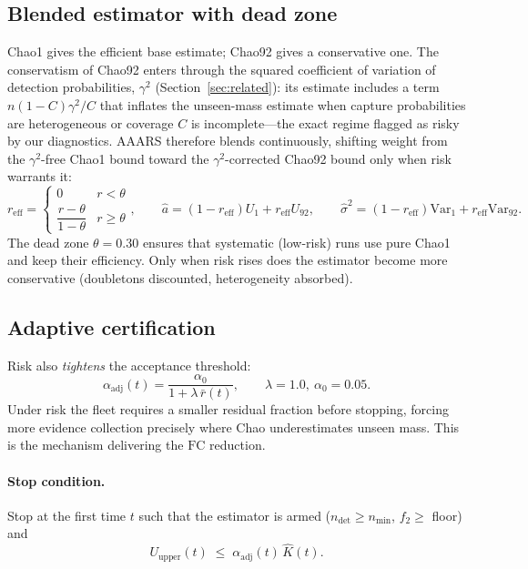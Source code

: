 \documentclass[11pt]{article}
\newcommand{\FC}{\mathrm{FC}}
\newcommand{\Khat}{\hat{K}}
\begin{document}
\subsection{Blended estimator with dead zone}
Chao1 gives the efficient base estimate; Chao92 gives a conservative one. The conservatism of
Chao92 enters through the squared coefficient of variation of detection probabilities, $\gamma^2$
(Section~\ref{sec:related}): its estimate includes a term $n(1-C)\gamma^2/C$ that inflates the
unseen-mass estimate when capture probabilities are heterogeneous or coverage $C$ is incomplete---the
exact regime flagged as risky by our diagnostics. AAARS therefore blends continuously, shifting
weight from the $\gamma^2$-free Chao1 bound toward the $\gamma^2$-corrected Chao92 bound only when
risk warrants it:
\begin{equation}
r_{\mathrm{eff}} = \begin{cases} 0 & r < \theta \\ \dfrac{r-\theta}{1-\theta} & r \ge \theta
\end{cases},
\qquad
\hat a = (1-r_{\mathrm{eff}})U_1 + r_{\mathrm{eff}}U_{92},
\qquad
\hat\sigma^2 = (1-r_{\mathrm{eff}})\mathrm{Var}_1 + r_{\mathrm{eff}}\mathrm{Var}_{92}.
\label{eq:blend}
\end{equation}
The dead zone $\theta=0.30$ ensures that systematic (low-risk) runs use pure Chao1 and keep their
efficiency. Only when risk rises does the estimator become more conservative (doubletons discounted,
heterogeneity absorbed).

\subsection{Adaptive certification}
Risk also \emph{tightens} the acceptance threshold:
\begin{equation}
\alpha_{\mathrm{adj}}(t) = \frac{\alpha_0}{1+\lambda\,\bar r(t)},
\qquad \lambda=1.0,\ \alpha_0=0.05 .
\label{eq:alpha}
\end{equation}
Under risk the fleet requires a smaller residual fraction before stopping, forcing more evidence
collection precisely where Chao underestimates unseen mass. This is the mechanism delivering the
$\FC$ reduction.

\paragraph{Stop condition.}
Stop at the first time $t$ such that the estimator is armed ($n_{\mathrm{det}}\ge n_{\min}$, $f_2
\ge$ floor) and
\begin{equation}
U_{\mathrm{upper}}(t) \;\le\; \alpha_{\mathrm{adj}}(t)\,\Khat(t).
\label{eq:stop}
\end{equation}
\end{document}
